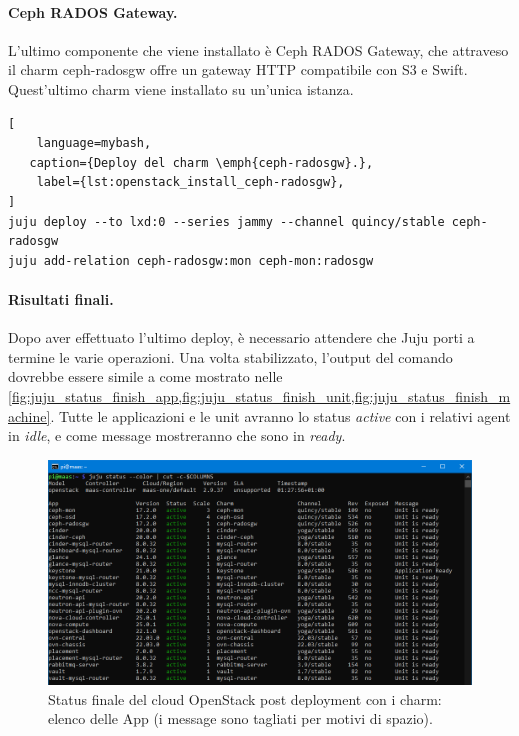 \paragraph{Ceph RADOS Gateway.}
L'ultimo componente che viene installato è Ceph RADOS Gateway, che attraveso il charm ceph-radosgw offre un gateway HTTP compatibile con S3 e Swift.
% 
Quest'ultimo charm viene installato su un'unica istanza.
\begin{lstlisting}[
    language=mybash, 
   caption={Deploy del charm \emph{ceph-radosgw}.},
    label={lst:openstack_install_ceph-radosgw},
]
juju deploy --to lxd:0 --series jammy --channel quincy/stable ceph-radosgw
juju add-relation ceph-radosgw:mon ceph-mon:radosgw
\end{lstlisting}


\paragraph{Risultati finali.}
Dopo aver effettuato l'ultimo deploy, è necessario attendere che Juju porti a termine le varie operazioni.
% 
Una volta stabilizzato, l'output del comando  dovrebbe essere simile a come mostrato nelle \cref{fig:juju_status_finish_app,fig:juju_status_finish_unit,fig:juju_status_finish_machine}.
%
Tutte le applicazioni e le unit avranno lo status \emph{active} con i relativi agent in \emph{idle}, e come message mostreranno che sono in \emph{ready}.


\begin{figure}%
    \centering
    \includegraphics[width=1\linewidth]{tesi/files/immagini/openstack/finish(app).png}
    \caption{Status finale del cloud OpenStack post deployment con i charm: elenco delle App (i message sono tagliati per motivi di spazio).}
    \label{fig:juju_status_finish_app}
\end{figure}

